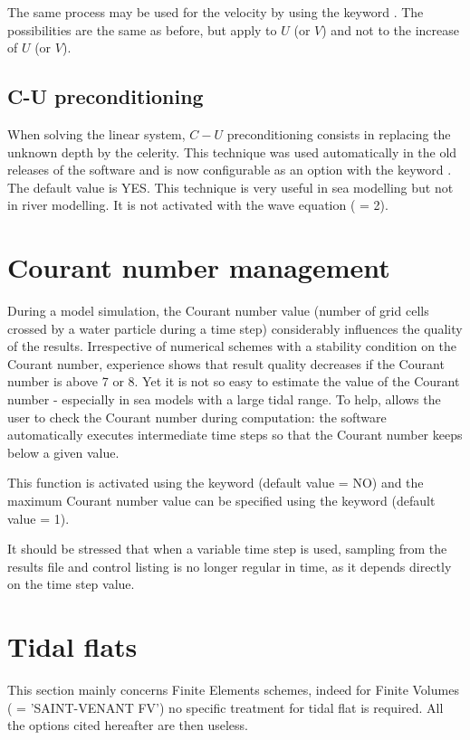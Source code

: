 The same process may be used for the velocity by using the keyword
.
The possibilities are the same as before, but apply to $U$ (or $V$)
and not to the increase of $U$ (or $V$).


\subsection{C-U preconditioning}

When solving the linear system, $C-U$ preconditioning consists
in replacing the unknown depth by the celerity.
This technique was used automatically in the old releases of the software
and is now configurable as an option with the keyword
.
The default value is YES.
This technique is very useful in sea modelling but not in river modelling.
It is not activated with the wave equation
( = 2).


\section{Courant number management}

During a model simulation, the Courant number value (number of grid cells
crossed by a water particle during a time step) considerably influences
the quality of the results.
Irrespective of numerical schemes with a stability condition on the Courant
number, experience shows that result quality decreases if the Courant number is
above 7 or 8.
Yet it is not so easy to estimate the value of the Courant number
- especially in sea models with a large tidal range.
To help,  allows the user to check the Courant number during
computation:
the software automatically executes intermediate time steps
so that the Courant number keeps below a given value.

This function is activated using the keyword 
(default value = NO) and the maximum Courant number value can be specified using
the keyword  (default value = 1).

It should be stressed that when a variable time step is used,
sampling from the results file and control listing is no longer regular in time,
as it depends directly on the time step value.


\section{Tidal flats}
This section mainly concerns Finite Elements schemes, indeed for Finite Volumes
( = 'SAINT-VENANT FV') no specific treatment for tidal flat
is required.
All the options cited hereafter are then useless.\\


